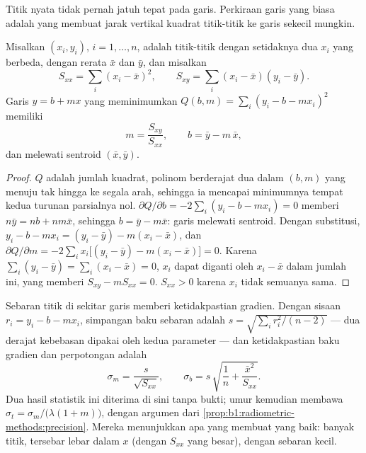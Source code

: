 Titik nyata tidak pernah jatuh tepat pada garis. Perkiraan garis yang biasa adalah yang membuat jarak vertikal kuadrat titik-titik ke garis sekecil mungkin.

\begin{proposition}\label{prop:b1:radiometric-methods:lsq}
Misalkan $(x_i, y_i)$, $i = 1, \dots, n$, adalah titik-titik dengan setidaknya dua $x_i$ yang berbeda, dengan rerata $\bar x$ dan $\bar y$, dan misalkan
\[
  S_{xx} = \sum_i (x_i - \bar x)^2, \qquad S_{xy} = \sum_i (x_i - \bar x)(y_i - \bar y).
\]
Garis $y = b + m x$ yang meminimumkan $Q(b, m) = \sum_i (y_i - b - m x_i)^2$ memiliki
\[
  m = \frac{S_{xy}}{S_{xx}}, \qquad b = \bar y - m\,\bar x ,
\]
dan melewati sentroid $(\bar x, \bar y)$.
\end{proposition}

\begin{proof}
$Q$ adalah jumlah kuadrat, polinom berderajat dua dalam $(b, m)$ yang menuju tak hingga ke segala arah, sehingga ia mencapai minimumnya tempat kedua turunan parsialnya nol. $\partial Q/\partial b = -2 \sum_i (y_i - b - m x_i) = 0$
memberi $n\bar y = n b + n m \bar x$, sehingga $b = \bar y - m \bar x$: garis melewati sentroid. Dengan substitusi, $y_i - b - m x_i = (y_i - \bar y) - m(x_i -
\bar x)$, dan $\partial Q/\partial m = -2 \sum_i x_i \bigl[(y_i - \bar y) - m(x_i
- \bar x)\bigr] = 0$. Karena $\sum_i (y_i - \bar y) = \sum_i (x_i - \bar x) = 0$, $x_i$
dapat diganti oleh $x_i - \bar x$ dalam jumlah ini, yang memberi $S_{xy} - m S_{xx} = 0$.
$S_{xx} > 0$ karena $x_i$ tidak semuanya sama.
\end{proof}

Sebaran titik di sekitar garis memberi ketidakpastian gradien. Dengan sisaan $r_i = y_i - b - m x_i$, simpangan baku sebaran adalah $s = \sqrt{\sum_i r_i^2/(n-2)}$ --- dua derajat kebebasan dipakai oleh kedua parameter --- dan ketidakpastian baku gradien dan perpotongan adalah
\[
  \sigma_m = \frac{s}{\sqrt{S_{xx}}}, \qquad
  \sigma_b = s\,\sqrt{\frac1n + \frac{\bar x^2}{S_{xx}}} .
\]
Dua hasil statistik ini diterima di sini tanpa bukti; umur kemudian membawa $\sigma_t = \sigma_m/\bigl(\lambda(1 + m)\bigr)$, dengan argumen dari \cref{prop:b1:radiometric-methods:precision}. Mereka menunjukkan apa yang membuat  yang baik: banyak titik, tersebar lebar dalam $x$ (dengan $S_{xx}$ yang besar), dengan sebaran kecil.

